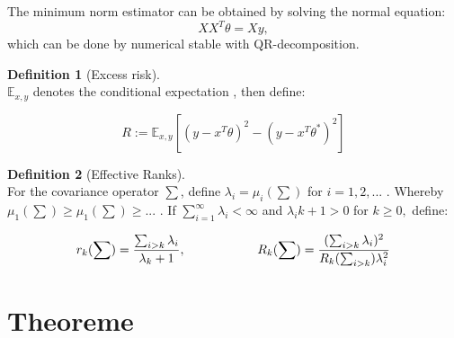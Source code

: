 \documentclass[a4paper,12pt]{scrartcl}
\theoremstyle{definition}
\newtheorem{definition}{Definition}[section]
\begin{document}
The minimum norm estimator can be obtained by solving the normal equation:
\begin{equation}
\label{eq:normal_equation}
	XX^T \theta = X y,
\end{equation}
which can be done by numerical stable with QR-decomposition.

\newpage

\begin{definition} [Excess risk] 
	\label{def:Excess risk}\ \\
	
	$\mathbb{E}_{x,y}$ denotes the conditional expectation , then define: 
	
	\begin{equation}
	R:= \mathbb{E}_{x,y}[(y - x^T\theta)^2 - (y - x^T\theta^*)^2]
	\end{equation} 
\end{definition}


\begin{definition} [Effective Ranks] 
	\label{def:Effective Ranks}\ \\
	
	For the covariance operator $\sum$, define $\lambda_i = \mu_i(\sum)$ for $i = 1,2,...$ . Whereby \newline $\mu_1(\sum) \geq \mu_1(\sum) \geq ...$ . If $\sum\limits_{i=1}^\infty \lambda_i < \infty$ and $\lambda_i{k+1} > 0$ for $k \geq 0,$ define: 
	
	\begin{equation}
	r_k(\sum) = \frac{\sum_{i>k}\lambda_i}{\lambda_k+1} ,\hspace*{2cm}
    R_k(\sum) = \frac{(\sum_{i>k}\lambda_i)^2}{R_k(\sum_{i>k})\lambda_i^2}
	\end{equation} 
\end{definition}

\newpage
\section{Theoreme} \label{sec:Theoreme}

\newtheorem{thm}{Theorem}
\end{document}
